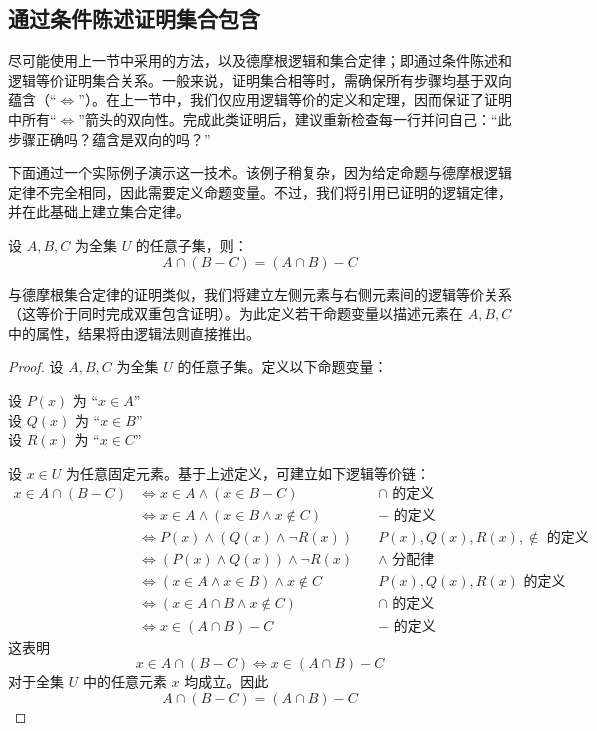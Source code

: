 \subsection{通过条件陈述证明集合包含}

尽可能使用上一节中采用的方法，以及德摩根逻辑和集合定律；即通过条件陈述和逻辑等价证明集合关系。一般来说，证明集合相等时，需确保所有步骤均基于双向蕴含（``$\iff$''）。在上一节中，我们仅应用逻辑等价的定义和定理，因而保证了证明中所有``$\iff$''箭头的双向性。完成此类证明后，建议重新检查每一行并问自己：``此步骤正确吗？蕴含是双向的吗？''

下面通过一个实际例子演示这一技术。该例子稍复杂，因为给定命题与德摩根逻辑定律不完全相同，因此需要定义命题变量。不过，我们将引用已证明的逻辑定律，并在此基础上建立集合定律。

\begin{proposition}
    设 $A, B, C$ 为全集 $U$ 的任意子集，则：
    \[A \cap (B - C) = (A \cap B) - C\]
\end{proposition}

与德摩根集合定律的证明类似，我们将建立左侧元素与右侧元素间的逻辑等价关系（这等价于同时完成双重包含证明）。为此定义若干命题变量以描述元素在 $A, B, C$ 中的属性，结果将由逻辑法则直接推出。

\begin{proof}
    设 $A, B, C$ 为全集 $U$ 的任意子集。定义以下命题变量：
    \begin{center}
        设 $P(x)$ 为 ``$x \in A$'' \\
        设 $Q(x)$ 为 ``$x \in B$'' \\
        设 $R(x)$ 为 ``$x \in C$'' 
    \end{center}
    设 $x \in U$ 为任意固定元素。基于上述定义，可建立如下逻辑等价链：
    \begin{align*}
        x \in A \cap (B - C) &\iff x \in A \land (x \in B - C) &\quad \cap \text{\ 的定义} \\
        &\iff x \in A \land (x \in B \land x \notin C) &\quad - \text{\ 的定义}\\
        &\iff P(x) \land (Q(x) \land \neg R(x)) &\quad P(x), Q(x), R(x), \notin \text{\ 的定义} \\
        &\iff (P(x) \land Q(x)) \land \neg R(x) &\quad \land \text{\ 分配律} \\
        &\iff (x \in A \land x \in B) \land x \notin C &\quad P(x), Q(x), R(x) \text{\ 的定义}\\
        &\iff (x \in A \cap B \land x \notin C) &\quad \cap \text{\ 的定义} \\
        &\iff x \in (A \cap B) - C &\quad - \text{\ 的定义}
    \end{align*}
    这表明
    \[x \in A \cap (B - C) \iff x \in (A \cap B) - C\]
    对于全集 $U$ 中的任意元素 $x$ 均成立。因此
    \[A \cap (B - C) = (A \cap B) - C\]
\end{proof}

